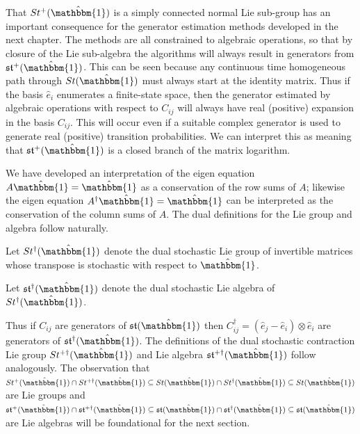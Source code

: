 That $St^{+}(\hat{\mathbbm{1}})$ is a simply connected normal Lie sub-group has an important
consequence for the generator estimation methods developed in the next chapter. The methods
are all constrained to algebraic operations, so that by closure of the Lie sub-algebra the
algorithms will always result in generators from $\mathfrak{st}^{+}(\hat{\mathbbm{1}})$.
This can be seen because any continuous time homogeneous path through $St(\hat{\mathbbm{1}})$
must always start at the identity matrix. Thus if the basis $\hat{e}_i$  enumerates a
finite-state space, then the generator estimated by algebraic operations with respect to $C_{ij}$
will always have real (positive) expansion in the basis $C_{ij}$. This will occur even if a
suitable complex generator is used to generate real (positive) transition probabilities. We
can interpret this as meaning that $\mathfrak{st}^{+}(\hat{\mathbbm{1}})$ is a closed branch
of the matrix logarithm.

We have developed an interpretation of the eigen equation $A \hat{\mathbbm{1}} = \hat{\mathbbm{1}}$
as a conservation of the row sums of $A$; likewise the eigen equation $A^\dagger \hat{\mathbbm{1}} = \hat{\mathbbm{1}}$
can be interpreted as the conservation of the column sums of $A$. The dual definitions for
the Lie group and algebra follow naturally.
\begin{definition}
	Let $St^\dagger(\hat{\mathbbm{1}})$ denote the dual stochastic Lie group of 
	invertible matrices whose transpose is stochastic with respect to $\hat{\mathbbm{1}}$.
\end{definition}

\begin{definition}
	Let $\mathfrak{st}^\dagger(\hat{\mathbbm{1}})$ denote the dual stochastic Lie 
	algebra of $St^\dagger(\hat{\mathbbm{1}})$.
\end{definition}
Thus if $C_{ij}$ are generators of $\mathfrak{st}(\hat{\mathbbm{1}})$ then $C_{ij}^\dagger = \left(\hat{e}_j - \hat{e}_i \right) \otimes \hat{e}_i$
are generators of $\mathfrak{st}^\dagger(\hat{\mathbbm{1}})$. The definitions of the dual 
stochastic contraction Lie group $St^{+\dagger}(\hat{\mathbbm{1}})$ and Lie algebra $\mathfrak{st}^{+\dagger}(\hat{\mathbbm{1}})$
follow analogously. The observation that $St^{+}(\hat{\mathbbm{1}}) \cap St^{+\dagger}(\hat{\mathbbm{1}}) \subseteq St(\hat{\mathbbm{1}}) \cap St^\dagger(\hat{\mathbbm{1}}) \subseteq St(\hat{\mathbbm{1}})$ 
are Lie groups and $\mathfrak{st}^{+}(\hat{\mathbbm{1}}) \cap \mathfrak{st}^{+\dagger}(\hat{\mathbbm{1}}) \subseteq \mathfrak{st}(\hat{\mathbbm{1}}) \cap \mathfrak{st}^\dagger(\hat{\mathbbm{1}}) \subseteq \mathfrak{st}(\hat{\mathbbm{1}})$ 
are Lie algebras will be foundational for the next section.
